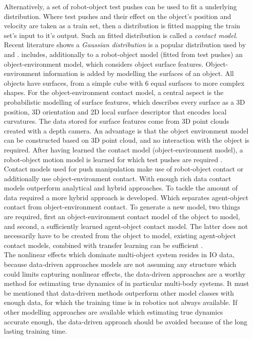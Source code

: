 Alternatively, a set of robot-object test pushes can be used to fit a underlying distribution. Where test pushes and their effect on the object's position and velocity are taken as a train set, then a distribution is fitted mapping the train set's input to it's output. Such an fitted distribution is called a \textit{contact model}. Recent literature shows a \textit{Gaussian distribution} is a popular distribution used by \cite{mericli_push-manipulation_2015} and \cite{stuber_feature-based_2018}. \cite{stuber_feature-based_2018} includes, additionally to a robot-object model (fitted from test pushes) an object-environment model, which considers object surface features. Object-environment information is added by modelling the surfaces of an object. All objects have surfaces, from a simple cube with 6 equal surfaces to more complex shapes. For the object-environment contact model, a central aspect is the probabilistic modelling of surface features, which describes every surface as a 3D position, 3D orientation and 2D local surface descriptor that encodes local curvatures. The data stored for surface features come from 3D point clouds created with a depth camera. An advantage is that the object environment model can be constructed based on 3D point cloud, and no interaction with the object is required. After having learned the contact model (object-environment model), a robot-object motion model is learned for which test pushes are required \cite{stuber_feature-based_2018}. \\

Contact models used for push manipulation make use of robot-object contact or additionally use object-environment contact. With enough rich data contact models outperform analytical and hybrid approaches. To tackle the amount of data required a more hybrid approach is developed. Which separates agent-object contact from object-environment contact. To generate a new model, two things are required, first an object-environment contact model of the object to model, and second, a sufficiently learned agent-object contact model. The latter does not necessarily have to be created from the object to model, existing agent-object contact models, combined with transfer learning can be sufficient \cite{kopicki_learning_2017}. \\

The nonlinear effects which dominate multi-object system resides in \ac{IO} data, because data-driven approaches models are not assuming any structure which could limits capturing nonlinear effects, the data-driven approaches are a worthy method for estimating true dynamics of in particular multi-body systems. It must be mentioned that data-driven methods outperform other model classes with enough data, for which the training time is in robotics not always available. If other modelling approaches are available which estimating true dynamics accurate enough, the data-driven approach should be avoided because of the long lasting training time.  

